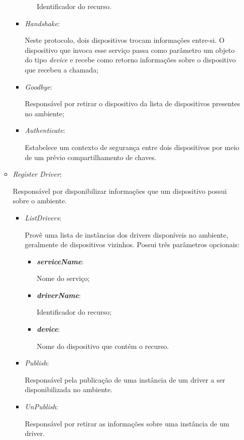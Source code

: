 \begin{itemize}
\begin{itemize}
\begin{itemize}
\begin{itemize}
							Identificador do recurso.
					\end{itemize}
				\item \emph{Handshake}: 

					Neste protocolo, dois dispositivos trocam informações entre-si. O dispositivo que invoca esse serviço passa como parâmetro um objeto do tipo \emph{device} e recebe como retorno informações sobre o dispositivo que recebeu a chamada;
				\item \emph{Goodbye}: 

					Responsável por retirar o dispositivo da lista de dispositivos presentes no ambiente;
				\item \emph{Authenticate}: 

					Estabelece um contexto de segurança entre dois dispositivos por meio de um prévio compartilhamento de chaves.
			\end{itemize}
		\item \emph{Register Driver}: 

			Responsável por disponibilizar informações que um dispositivo possui sobre o ambiente.
			\begin{itemize}
				\item \emph{ListDrivers}: 

					Provê uma lista de instâncias dos drivers disponíveis no ambiente, geralmente de dispositivos vizinhos. Possui três parâmetros opcionais:
					\begin{itemize}
						\item \emph{\bf{serviceName}}: 

							Nome do serviço;
						\item \emph{\bf{driverName}}: 

							Identificador do recurso;
						\item \emph{\bf{device}}: 
							
							Nome do dispositivo que contém o recurso.
					\end{itemize}
				\item \emph{Publish}: 

					Responsável pela publicação de uma instância de um driver a ser disponibilizada no ambiente.
				\item \emph{UnPublish}: 

					Responsável por retirar as informações sobre uma instância de um driver.
			\end{itemize}
	\end{itemize}
\end{itemize}

